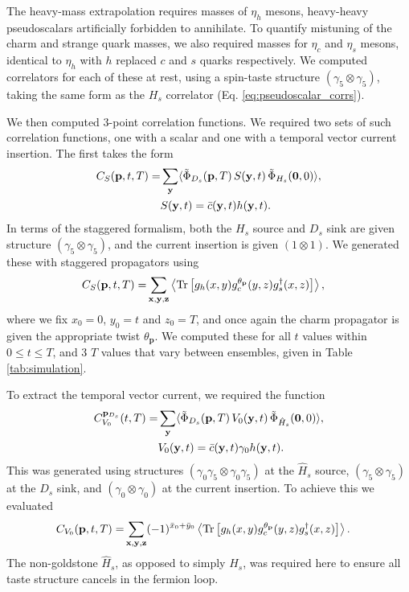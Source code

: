 The heavy-mass extrapolation requires masses of $\eta_h$ mesons, heavy-heavy pseudoscalars artificially forbidden to annihilate. To quantify mistuning of the charm and strange quark masses, we also required masses for $\eta_c$ and $\eta_s$ mesons, identical to $\eta_h$ with $h$ replaced $c$ and $s$ quarks respectively. We computed correlators for each of these at rest, using a spin-taste structure $(\gamma_5\otimes \gamma_5)$, taking the same form as the $H_s$ correlator (Eq. \eqref{eq:pseudoscalar_corrs}).

We then computed 3-point correlation functions. We required two sets of such correlation functions, one with a scalar and one with a temporal vector current insertion. The first takes the form
\begin{align}
  C_S({\textbf{p}},t,T) =& \sum_{{\bf{y}}} \langle \tilde{\Phi}_{D_s}({\bf{p}},T)\, S({\bf{y}},t) \,\tilde{\Phi}_{H_s}({\bf{0}},0) \rangle, \\ &S({\bf{y}},t) = \bar{c}({\bf{y}},t) h({\bf{y}},t). \nonumber
\end{align}
In terms of the staggered formalism, both the $H_s$ source and $D_s$ sink are given structure $(\gamma_5\otimes \gamma_5)$, and the current insertion is given $(1\otimes1)$. We generated these with staggered propagators using
\begin{align}
  C_S({\textbf{p}},t,T) =& \sum_{{\bf{x},\bf{y},\bf{z}}} \left\langle \text{Tr}\left[ g_h(x,y)g^{\theta_{\textbf{p}}}_c(y,z) g^{\dagger}_s(x,z) \right] \right\rangle,
\end{align}
where we fix $x_0 = 0$, $y_0=t$ and $z_0=T$, and once again the charm propagator is given the appropriate twist $\theta_{\textbf{p}}$. We computed these for all $t$ values within $0\leq t\leq T$, and 3 $T$ values that vary between ensembles, given in Table \ref{tab:simulation}.

To extract the temporal vector current, we required the function
\begin{align}
  C^{{\bf{p}}_{D_s}}_{V_0}(t,T) =& \sum_{{\bf{y}}} \langle \tilde{\Phi}_{D_s}({\bf{p}},T)\, V_0({\bf{y}},t) \,\tilde{\Phi}_{\hat{H}_s}({\bf{0}},0) \rangle, \\ &V_0({\bf{y}},t) = \bar{c}({\bf{y}},t) \gamma_0 h({\bf{y}},t). \nonumber
\end{align}
This was generated using structures $(\gamma_0\gamma_5\otimes \gamma_0\gamma_5)$ at the $\hat{H}_s$ source, $(\gamma_5\otimes \gamma_5)$ at the $D_s$ sink, and $(\gamma_0\otimes \gamma_0)$ at the current insertion. To achieve this we evaluated
\begin{align}
  C_{V_0}({\textbf{p}},t,T) =& \sum_{{\bf{x},\bf{y},\bf{z}}} (-1)^{\bar{x}_0+\bar{y}_0} \left\langle \text{Tr}\left[ g_h(x,y)g^{\theta_{\textbf{p}}}_c(y,z) g^{\dagger}_s(x,z) \right] \right\rangle.
\end{align}
The non-goldstone $\hat{H}_s$, as opposed to simply $H_s$, was required here to ensure all taste structure cancels in the fermion loop.

